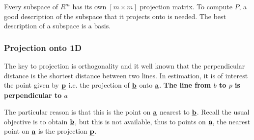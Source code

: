 \documentclass[10pt,a4paper]{article}
\begin{document}
Every subspace of $R^m$ has its own $[m\times m]$ projection matrix. To compute $P$, a good
description of the subspace that it projects onto is needed. The best description of a subspace is a
basis.

\subsubsection{Projection onto 1D}

The key to projection is orthogonality and it well known that the perpendicular distance is the
shortest distance between two lines. In estimation, it is of interest the point given by
$\textbf{\underline{p}}$ i.e. the projection of $\textbf{\underline{b}}$ onto
$\textbf{\underline{a}}$. \textbf{The line from $b$ to $p$ is perpendicular to $a$}

The particular reason is that this is the point on $\textbf{\underline{a}}$ nearest to
$\textbf{\underline{b}}$. Recall the usual objective is to obtain $\textbf{\underline{b}}$, but this
is not available, thus to points on $\textbf{\underline{a}}$, the nearest point on
$\textbf{\underline{a}}$ is the projection $\textbf{\underline{p}}$. 
\end{document}
